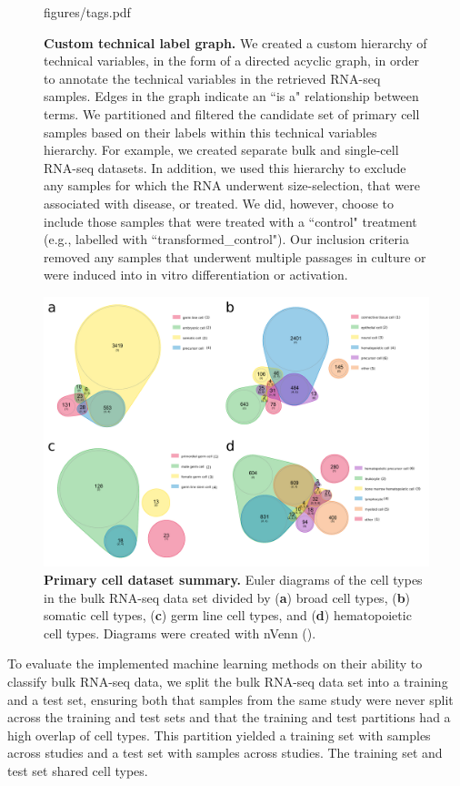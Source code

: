 \begin{figure}
{    {figures/tags.pdf}}
    \caption{\textbf{Custom technical label graph.} We created a custom hierarchy of technical variables, in the form of a directed acyclic graph, in order to annotate the technical variables in the retrieved RNA-seq samples. Edges in the graph indicate an ``is a" relationship between terms.  We partitioned and filtered the candidate set of primary cell samples based on their labels within this technical variables hierarchy.  For example, we created separate bulk and single-cell RNA-seq datasets. In addition, we used this hierarchy to exclude any samples for which the RNA underwent size-selection, that were associated with disease, or treated.  We did, however, choose to include those samples that were treated with a ``control" treatment (e.g., labelled with ``transformed\_control").  Our inclusion criteria removed any samples that underwent multiple passages in culture or were induced into in vitro differentiation or activation.}
    \label{fig:tech_labels}
      \end{figure} 

  \begin{figure}[h!]
    \centerline{\includegraphics[width=13cm]{figures/data_venn.pdf}}
    \caption{
      \textbf{Primary cell dataset summary.} Euler diagrams of the cell types in the bulk RNA-seq data set divided by (\textbf{a}) broad cell types, (\textbf{b}) somatic cell types, (\textbf{c}) germ line cell types, and  (\textbf{d}) hematopoietic cell types. Diagrams were created with nVenn (\citealp{PerezSilva2018}). }
    \label{fig:dataset_summary}
      \end{figure}

To evaluate the implemented machine learning methods on their ability to classify bulk RNA-seq data, we split the bulk RNA-seq data set into a training and a test set, ensuring both that samples from the same study were never split across the training and test sets and that the training and test partitions had a high overlap of cell types. This partition yielded a training set with \ExperimentsInBulkTrainingDataset{} samples across \StudiesInBulkTrainingDataset{} studies and a test set with \ExperimentsInBulkTestDataset{} samples across \StudiesInBulkTestDataset{} studies. The training set and test set shared \NumCellTypesIntersectTrainingTest{} cell types. 

